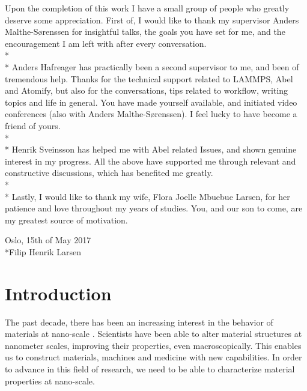 \documentclass[twoside,english]{uiofysmaster}
\begin{document}
\begin{acknowledgements}
Upon the completion of this work I have a small group of people who greatly deserve some appreciation. 
First of, I would like to thank my supervisor Anders Malthe-Sørenssen for insightful talks, the goals you have set for me, and the encouragement I am left with after every conversation.
\\*\\*
Anders Hafreager has practically been a second supervisor to me, and been of tremendous help. 
Thanks for the technical support related to LAMMPS, Abel and Atomify, but also for the conversations, tips related to workflow, writing topics and life in general. 
You have made yourself available, and initiated video conferences (also with Anders Malthe-Sørenssen).
I feel lucky to have become a friend of yours. 
\\*\\*
Henrik Sveinsson has helped me with Abel related Issues, and shown genuine interest in my progress. 
All the above have supported me through relevant and constructive discussions, which has benefited me greatly. 
\\*\\*
Lastly, I would like to thank my wife, Flora Joelle Mbuebue Larsen, for her patience and love throughout my years of studies. 
You, and our son to come, are my greatest source of motivation.  

\begin{flushright}
	Oslo, 15th of May 2017
	\\*Filip Henrik Larsen
\end{flushright}


	
	

\end{acknowledgements}
{
\hypersetup{linkcolor = black}
\tableofcontents
}
\chapter{Introduction} \label{chp:introduction}

The past decade, there has been an increasing interest in the behavior of materials at nano-scale \cite{nanoOnReflection}.
Scientists have been able to alter material structures at nanometer scales, improving their properties, even macroscopically.
This enables us to construct materials, machines and medicine with new capabilities.   
In order to advance in this field of research, we need to be able to characterize material properties at nano-scale.
\end{document}
